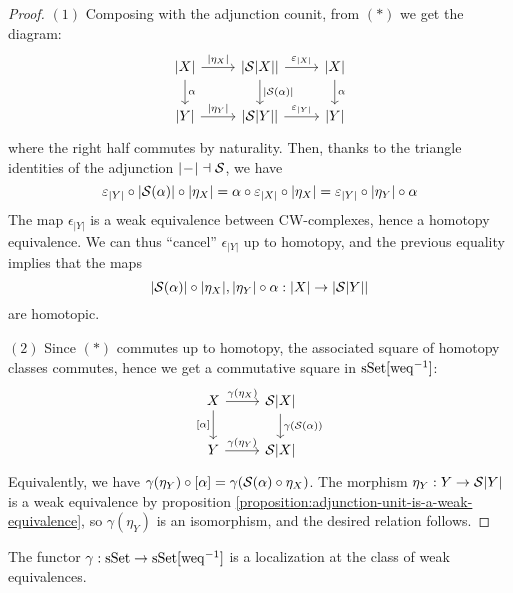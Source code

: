 \begin{proof}
$(1)$ Composing with the adjunction counit, from $(*)$ we get the diagram:
\[
    \begin{tikzcd}
    {|X|} \ar[d,"\alpha"] \ar[r,"{|\eta_X|}"] & {|\S|X||} \ar[d,"{|\S(\alpha)|}"] \ar[r,"\epsilon_{|X|}"] & {|X|} \ar[d,"\alpha"]\\
    {|Y|} \ar[r,"{|\eta_Y|}"] & {|\S|Y||} \ar[r,"\epsilon_{|Y|}"] & {|Y|}
    \end{tikzcd}
\]
where the right half commutes by naturality. Then, thanks to the triangle identities of the adjunction $|\!-\!|\dashv\S$, we have
\[\epsilon_{|Y|}\circ|\S(\alpha)|\circ|\eta_X|=\alpha\circ\epsilon_{|X|}\circ|\eta_X|=\epsilon_{|Y|}\circ|\eta_Y|\circ\alpha\]
The map $\epsilon_{|Y|}$ is a weak equivalence between CW-complexes, hence a homotopy equivalence. We can thus \enquote{cancel} $\epsilon_|Y|$ up to homotopy, and the previous equality implies that the maps
\[|\S(\alpha)|\circ|\eta_X|,|\eta_Y|\circ\alpha:|X|\to|\S|Y||\]
are homotopic.

$(2)$ Since $(*)$ commutes up to homotopy, the associated square of homotopy classes commutes, hence we get a commutative square in $\sSet[\weq^\inv]$:
\[
\begin{tikzcd}
X \ar[d,"{[\alpha]}"'] \ar[r,"\gamma(\eta_X)"] & {\S|X|} \ar[d,"\gamma(\S(\alpha))"]\\
Y \ar[r,"\gamma(\eta_Y)"] & {\S|X|}
\end{tikzcd}
\]
Equivalently, we have $\gamma(\eta_Y)\circ[\alpha]=\gamma(\S(\alpha)\circ\eta_X)$. The morphism $\eta_Y:Y\to\S|Y|$ is a weak equivalence by proposition \ref{proposition:adjunction-unit-is-a-weak-equivalence}, so $\gamma(\eta_Y)$ is an isomorphism, and the desired relation follows.
\end{proof}

\begin{theorem}\label{theorem:localization-of-sset}
The functor $\gamma:\sSet\to\sSet[\weq^\inv]$ is a localization at the class of weak equivalences.
\end{theorem}

